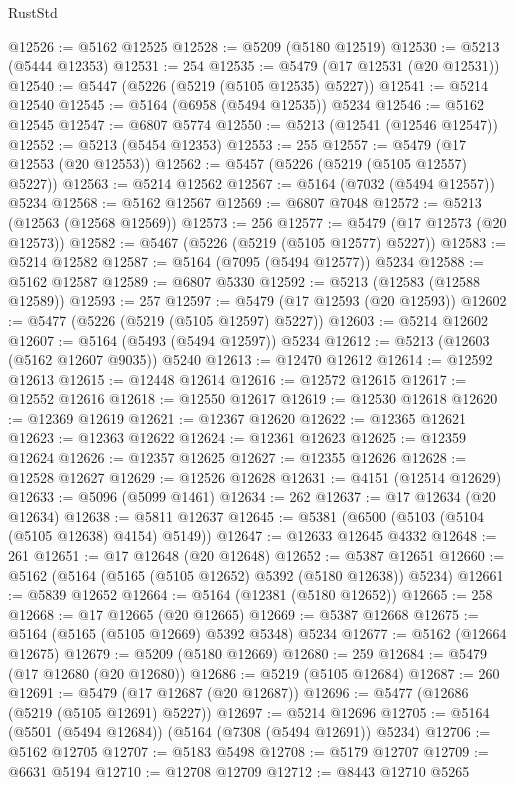 \begin{lexlean}{RustStd}
\begin{coremodule}
@12526 := @5162 @12525
@12528 := @5209 (@5180 @12519)
@12530 := @5213 (@5444 @12353)
@12531 := 254
@12535 := @5479 (@17 @12531 (@20 @12531))
@12540 := @5447 (@5226 (@5219 (@5105 @12535) @5227))
@12541 := @5214 @12540
@12545 := @5164 (@6958 (@5494 @12535)) @5234
@12546 := @5162 @12545
@12547 := @6807 @5774
@12550 := @5213 (@12541 (@12546 @12547))
@12552 := @5213 (@5454 @12353)
@12553 := 255
@12557 := @5479 (@17 @12553 (@20 @12553))
@12562 := @5457 (@5226 (@5219 (@5105 @12557) @5227))
@12563 := @5214 @12562
@12567 := @5164 (@7032 (@5494 @12557)) @5234
@12568 := @5162 @12567
@12569 := @6807 @7048
@12572 := @5213 (@12563 (@12568 @12569))
@12573 := 256
@12577 := @5479 (@17 @12573 (@20 @12573))
@12582 := @5467 (@5226 (@5219 (@5105 @12577) @5227))
@12583 := @5214 @12582
@12587 := @5164 (@7095 (@5494 @12577)) @5234
@12588 := @5162 @12587
@12589 := @6807 @5330
@12592 := @5213 (@12583 (@12588 @12589))
@12593 := 257
@12597 := @5479 (@17 @12593 (@20 @12593))
@12602 := @5477 (@5226 (@5219 (@5105 @12597) @5227))
@12603 := @5214 @12602
@12607 := @5164 (@5493 (@5494 @12597)) @5234
@12612 := @5213 (@12603 (@5162 @12607 @9035)) @5240
@12613 := @12470 @12612
@12614 := @12592 @12613
@12615 := @12448 @12614
@12616 := @12572 @12615
@12617 := @12552 @12616
@12618 := @12550 @12617
@12619 := @12530 @12618
@12620 := @12369 @12619
@12621 := @12367 @12620
@12622 := @12365 @12621
@12623 := @12363 @12622
@12624 := @12361 @12623
@12625 := @12359 @12624
@12626 := @12357 @12625
@12627 := @12355 @12626
@12628 := @12528 @12627
@12629 := @12526 @12628
@12631 := @4151 (@12514 @12629)
@12633 := @5096 (@5099 @1461)
@12634 := 262
@12637 := @17 @12634 (@20 @12634)
@12638 := @5811 @12637
@12645 := @5381 (@6500 (@5103 (@5104 (@5105 @12638) @4154) @5149))
@12647 := @12633 @12645 @4332
@12648 := 261
@12651 := @17 @12648 (@20 @12648)
@12652 := @5387 @12651
@12660 := @5162 (@5164 (@5165 (@5105 @12652) @5392 (@5180 @12638)) @5234)
@12661 := @5839 @12652
@12664 := @5164 (@12381 (@5180 @12652))
@12665 := 258
@12668 := @17 @12665 (@20 @12665)
@12669 := @5387 @12668
@12675 := @5164 (@5165 (@5105 @12669) @5392 @5348) @5234
@12677 := @5162 (@12664 @12675)
@12679 := @5209 (@5180 @12669)
@12680 := 259
@12684 := @5479 (@17 @12680 (@20 @12680))
@12686 := @5219 (@5105 @12684)
@12687 := 260
@12691 := @5479 (@17 @12687 (@20 @12687))
@12696 := @5477 (@12686 (@5219 (@5105 @12691) @5227))
@12697 := @5214 @12696
@12705 := @5164 (@5501 (@5494 @12684)) (@5164 (@7308 (@5494 @12691)) @5234)
@12706 := @5162 @12705
@12707 := @5183 @5498
@12708 := @5179 @12707
@12709 := @6631 @5194
@12710 := @12708 @12709
@12712 := @8443 @12710 @5265

\end{coremodule}
\end{lexlean}
